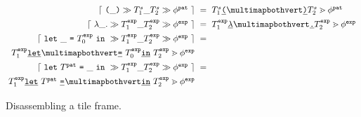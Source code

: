 \begin{figure}
  \vspace{-3px}
  \[
  \setlength{\fboxsep}{1pt}
  \arraycolsep=3pt\def\arraystretch{1.4}\begin{array}{rcl}
      \disassembleTileFrame{
        \tframelit{
          \sparen{\_}
        }{
          \tframelit{\tiles^s_1\_\tiles^s_2}{\tfrelem^{\pat}}
        }
      } & = &
        \zipper{
          \pointing{\tiles^s_1\tokenLit{\texttt{(}}~}{~\tokenLit{\texttt{)}}\tiles^s_2}
        }{
          \tfrelem^{\pat}
        } \\

      \disassembleTileFrame{
        \tframelit{
          \slam{\_}{}
        }{
          \tframelit{\tiles^{\expr}_1\_\tiles^{\expr}_2}{\tfrelem^{\expr}}
        }
      } & = &
        \zipper{
          \pointing{\tiles^{\expr}_1\tokenLit{\lambda}~}{~\tokenLit{\texttt{.}}\tiles^{\expr}_2}
        }{
          \tfrelem^{\expr}
        } \\

      \disassembleTileFrame{
        \tframelit{
          \slet{\_}{\tiles^{\expr}_0}{}
        }{
          \tframelit{\tiles^{\expr}_1\_\tiles^{\expr}_2}{\tfrelem^{\expr}}
        }
      } & = & \\
        \zipper{
          \pointing{
            \tiles^{\expr}_1\tokenLit{\texttt{let}}~
          }{
            ~\tokenLit{\texttt{=}}~\tiles^{\expr}_0\tokenLit{\texttt{in}}~\tiles^{\expr}_2
          }
        }{
          \tfrelem^{\expr}
        } \\

      \disassembleTileFrame{
        \tframelit{
          \slet{\tiles^{\pat}}{\_}{}
        }{
          \tframelit{\tiles^{\expr}_1\_\tiles^{\expr}_2}{\tfrelem^{\expr}}
        }
      } & = & \\
        \zipper{
          \pointing{
            \tiles^{\expr}_1\tokenLit{\texttt{let}}~\tiles^{\pat}~\tokenLit{\texttt{=}}~
          }{
            ~\tokenLit{\texttt{in}}~\tiles^{\expr}_2
          }
        }{
          \tfrelem^{\expr}
        }
  \end{array}\]
  \caption{
    Disassembling a tile frame. 
  }
  \label{fig:disassemble-tile}
\end{figure}